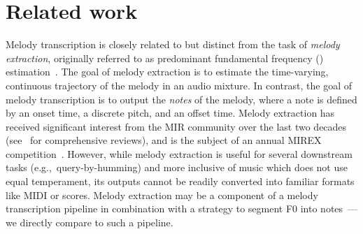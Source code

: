 \section{Related work}\label{sec:related}

Melody transcription is closely related to but distinct from the task of \emph{melody extraction}, originally referred to as predominant fundamental frequency (\fnot) estimation~\cite{goto1999real,goto2004real}. 
The goal of melody extraction is to estimate the time-varying, continuous \fnot{} trajectory of the melody in an audio mixture. 
In contrast, the goal of melody transcription is to output the \emph{notes} of the melody, where a note is defined by an onset time, a discrete  pitch, and an offset time. 
Melody extraction has received significant interest from the MIR community over the last two decades (see~\cite{salamon2014melody,rao2022melody} for comprehensive reviews), 
and is the subject of an annual MIREX competition~\cite{downie2014ten}. 
However, 
while melody extraction is useful for several downstream tasks (e.g.,~query-by-humming) and more inclusive of music which does not use equal temperament, 
its outputs cannot be readily converted into familiar formats like MIDI or scores. 
Melody extraction may be a component of a melody transcription pipeline in combination with a strategy to segment F0 
into notes~\cite{salamon2015midi,nishikimi2016musical,nishikimi2017scale}---we directly compare to such a pipeline.

